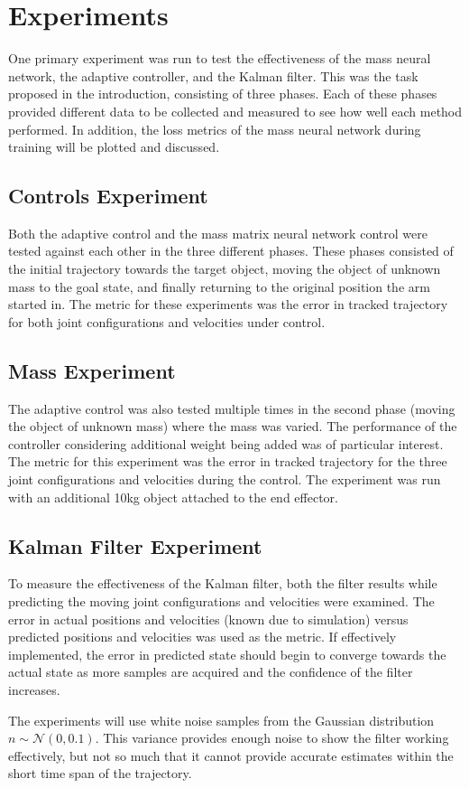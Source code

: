 \section{Experiments}
One primary experiment was run to test the effectiveness of the mass neural network, the adaptive controller, and the Kalman filter.
This was the task proposed in the introduction, consisting of three phases.
Each of these phases provided different data to be collected and measured to see how well each method performed.
In addition, the loss metrics of the mass neural network during training will be plotted and discussed.

\subsection*{Controls Experiment}
Both the adaptive control and the mass matrix neural network control were tested against each other in the three different phases.
These phases consisted of the initial trajectory towards the target object, moving the object of unknown mass to the goal state, and finally returning to the original position the arm started in.
The metric for these experiments was the error in tracked trajectory for both joint configurations and velocities under control.

\subsection*{Mass Experiment}
The adaptive control was also tested multiple times in the second phase (moving the object of unknown mass) where the mass was varied.
The performance of the controller considering additional weight being added was of particular interest.
The metric for this experiment was the error in tracked trajectory for the three joint configurations and velocities during the control.
The experiment was run with an additional 10kg object attached to the end effector.

\subsection*{Kalman Filter Experiment}
To measure the effectiveness of the Kalman filter, both the filter results while predicting the moving joint configurations and velocities were examined.
The error in actual positions and velocities (known due to simulation) versus predicted positions and velocities was used as the metric.
If effectively implemented, the error in predicted state should begin to converge towards the actual state as more samples are acquired and the confidence of the filter increases.

The experiments will use white noise samples from the Gaussian distribution $n\sim \mathcal{N}(0,0.1)$.
This variance provides enough noise to show the filter working effectively, but not so much that it cannot provide accurate estimates within the short time span of the trajectory.


